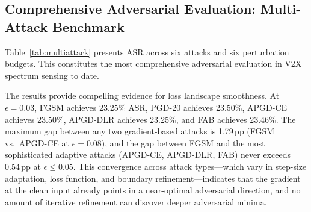 \documentclass[conference]{IEEEtran}
\begin{document}
\subsection{Comprehensive Adversarial Evaluation: Multi-Attack Benchmark}

\label{sec:multiattack}

Table~\ref{tab:multiattack} presents ASR across six attacks and six perturbation budgets. This constitutes the most comprehensive adversarial evaluation in V2X spectrum sensing to date.

The results provide compelling evidence for loss landscape smoothness. At $\epsilon = 0.03$, FGSM achieves 23.25\% ASR, PGD-20 achieves 23.50\%, APGD-CE achieves 23.50\%, APGD-DLR achieves 23.25\%, and FAB achieves 23.46\%. The maximum gap between any two gradient-based attacks is 1.79\,pp (FGSM vs.\ APGD-CE at $\epsilon=0.08$), and the gap between FGSM and the most sophisticated adaptive attacks (APGD-CE, APGD-DLR, FAB) never exceeds 0.54\,pp at $\epsilon \leq 0.05$. This convergence across attack types---which vary in step-size adaptation, loss function, and boundary refinement---indicates that the gradient at the clean input already points in a near-optimal adversarial direction, and no amount of iterative refinement can discover deeper adversarial minima.

\begin{table}[t]
\centering
\caption{Attack Success Rate (\%) on Standard-Trained Model (3-Seed Mean $\pm$ Std)}
\label{tab:multiattack}
\end{table}
\end{document}
